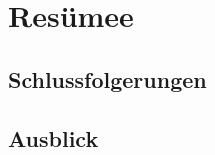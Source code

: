 \chapter{Resümee}
\label{sec:SUMMARY}

\section{Schlussfolgerungen}
\label{sec:SUMMARY_CONCLUSION}

\section{Ausblick}
\label{sec:SUMMARY_OUTLOOK}

